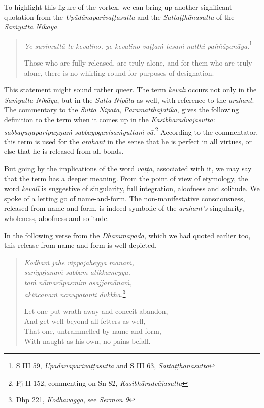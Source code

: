 To highlight this figure of the vortex, we can bring up another significant quotation from the \emph{Upādānaparivaṭṭasutta} and the \emph{Sattaṭṭhānasutta} of the \emph{Saṁyutta Nikāya}.

\begin{quote}
\emph{Ye suvimuttā te kevalino, ye kevalino vaṭṭaṁ tesaṁ natthi paññāpanāya}.\footnote{S III 59, \emph{Upādānaparivaṭṭasutta} and S III 63, \emph{Sattaṭṭhānasutta}}

Those who are fully released, are truly alone, and for them who are truly alone, there is no whirling round for purposes of designation.
\end{quote}

This statement might sound rather queer. The term \emph{kevalī} occurs not only in the \emph{Saṁyutta Nikāya}, but in the \emph{Sutta Nipāta} as well, with reference to the \emph{arahant}. The commentary to the \emph{Sutta Nipāta}, \emph{Paramatthajotikā}, gives the following definition to the term when it comes up in the \emph{Kasibhāradvājasutta}: \emph{sabbaguṇaparipuṇṇaṁ sabbayogavisaṁyuttaṁ vā}.\footnote{Pj II 152, commenting on Sn 82, \emph{Kasibhāradvājasutta}} According to the commentator, this term is used for the \emph{arahant} in the sense that he is perfect in all virtues, or else that he is released from all bonds.

But going by the implications of the word \emph{vaṭṭa}, associated with it, we may say that the term has a deeper meaning. From the point of view of etymology, the word \emph{kevalī} is suggestive of singularity, full integration, aloofness and solitude. We spoke of a letting go of name-and-form. The non-manifestative consciousness, released from name-and-form, is indeed symbolic of the \emph{arahant's} singularity, wholeness, aloofness and solitude.

In the following verse from the \emph{Dhammapada}, which we had quoted earlier too, this release from name-and-form is well depicted.

\begin{quote}
\emph{Kodhaṁ jahe vippajaheyya mānaṁ,}\\
\emph{saṁyojanaṁ sabbam atikkameyya,}\\
\emph{taṁ nāmarūpasmim asajjamānaṁ,}\\
\emph{akiñcanaṁ nānupatanti dukkhā.}\footnote{Dhp 221, \emph{Kodhavagga}, see \emph{Sermon 9}}

Let one put wrath away and conceit abandon,\\
And get well beyond all fetters as well,\\
That one, untrammelled by name-and-form,\\
With naught as his own, no pains befall.
\end{quote}

